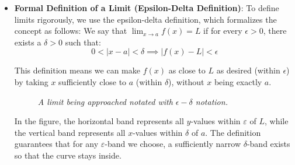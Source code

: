 \begin{itemize}
\item \textbf{Formal Definition of a Limit (Epsilon-Delta Definition)}: 
To define limits rigorously, we use the epsilon-delta definition, which formalizes the concept as follows: We say that $\lim_{x \to a} f(x) = L$ if for every $\epsilon > 0$, there exists a $\delta > 0$ such that:
\[0 < |x - a| < \delta \implies |f(x) - L| < \epsilon\]

This definition means we can make $f(x)$ as close to $L$ as desired (within $\epsilon$) by taking $x$ sufficiently close to $a$ (within $\delta$), without $x$ being exactly $a$.

\begin{figure}[H]
    \centering
{}
    \caption{\textit{A limit being approached notated with $\epsilon-\delta$ notation.}}
\end{figure}

\noindent In the figure, the horizontal band represents all \( y \)-values within \( \varepsilon \) of \( L \), while the vertical band represents all \( x \)-values within \( \delta \) of \( a \). The definition guarantees that for any \( \varepsilon \)-band we choose, a sufficiently narrow \( \delta \)-band exists so that the curve stays inside.\\ \\


\end{itemize}
